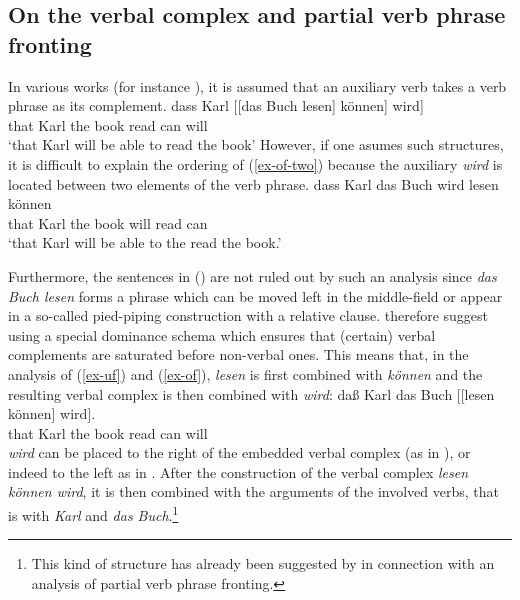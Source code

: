 {{\subsection{On the verbal complex and partial verb phrase fronting}
\label{sec-pred-compl}

In various works (for instance \citealp{Uszkoreit87a}), it is assumed that an
auxiliary verb takes a verb phrase as its complement.
\ea
\label{ex-uf-two}
\gll dass Karl [[das Buch lesen] können] wird]\\
	 that Karl the book read can will\\
\glt `that Karl will be able to read the book'
\z
However, if one asumes such structures, it is difficult to explain the ordering of (\ref{ex-of-two}) because the auxiliary \emph{wird} is located between two elements
of the verb phrase.
\ea
\label{ex-of-two}
\gll dass Karl das Buch wird lesen können\\
     that Karl the book will read can\\
\glt `that Karl will be able to the read the book.'
\z

Furthermore, the sentences in () are not ruled out by such an analysis since \emph{das Buch lesen} 
forms a phrase which can be moved left in the middle-field or appear in a so-called pied-piping construction 
with a relative clause.
\eal
{}
\zl
%
\citet*{HN94a} therefore suggest using a special dominance schema which ensures that
(certain) verbal complements are saturated before non-verbal ones. This means that, in the analysis of (\ref{ex-uf}) and (\ref{ex-of}),
\emph{lesen} is first combined with \emph{können} and the resulting verbal complex is then combined with \emph{wird}:
\ea
\gll daß Karl das Buch [[lesen können] wird].\\
     that Karl the book \hspaceThis{[[}read can will\\
\z
\emph{wird} can be placed to the right of the embedded verbal complex (as in ), or indeed to the left as
in . After the construction of the verbal complex \emph{lesen können wird}, it is then combined with the 
arguments of the involved verbs, that is with \emph{Karl} and \emph{das Buch}.\footnote{%
		This kind of structure has already been suggested 
		by \citet*{Johnson86a} in connection with an analysis of partial verb phrase fronting.
}

}}
